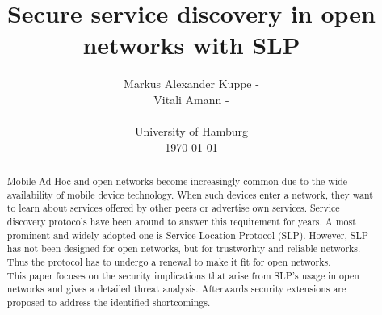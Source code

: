 \title{Secure service discovery in open networks with SLP}
\author{
Markus Alexander Kuppe - \\
Vitali Amann - \\\\
University of Hamburg\\
\today
}

\maketitle

\begin{abstract}
Mobile Ad-Hoc and open networks become increasingly common due to the wide availability of mobile device technology. When such devices enter a network, they want to learn about services offered by other peers or advertise own services. Service discovery protocols have been around to answer this requirement for years. A most prominent and widely adopted one is Service Location Protocol (SLP). However, SLP has not been designed for open networks, but for trustworhty and reliable networks. Thus the protocol has to undergo a renewal to make it fit for open networks.\\
This paper focuses on the security implications that arise from SLP's usage in open networks and gives a detailed threat analysis. Afterwards security extensions are proposed to address the identified shortcomings.
\end{abstract}
